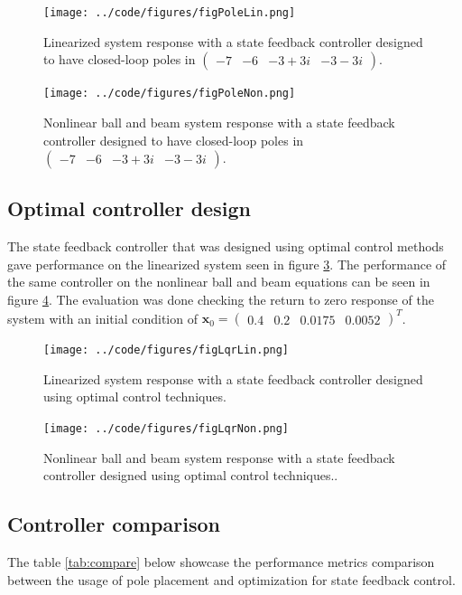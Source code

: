 \documentclass[a4paper, titlepage]{article}
\begin{document}
\begin{figure}[H]
\center
\texttt{[image: ../code/figures/figPoleLin.png]}
\caption{Linearized system response with a state feedback controller designed to have closed-loop poles in $\begin{pmatrix} -7 & -6 & -3+3i & -3-3i \end{pmatrix}$.}
\label{fig:poleLin}
\end{figure}

\begin{figure}[H]
\center
\texttt{[image: ../code/figures/figPoleNon.png]}
\caption{Nonlinear ball and beam system response with a state feedback controller designed to have closed-loop poles in $\begin{pmatrix} -7 & -6 & -3+3i & -3-3i \end{pmatrix}$.}
\label{fig:poleNon}
\end{figure}

\subsection{Optimal controller design}
The state feedback controller that was designed using optimal control methods gave performance on the linearized system seen in figure \ref{fig:lqrLin}.
The performance of the same controller on the nonlinear ball and beam equations can be seen in figure \ref{fig:lqrNon}.
The evaluation was done checking the return to zero response of the system with an initial condition of $\textbf{x}_0 = \begin{pmatrix} 0.4 & 0.2 & 0.0175 & 0.0052 \end{pmatrix}^T$.

\begin{figure}[H]
\center
\texttt{[image: ../code/figures/figLqrLin.png]}
\caption{Linearized system response with a state feedback controller designed using optimal control techniques.}
\label{fig:lqrLin}
\end{figure}

\begin{figure}[H]
\center
\texttt{[image: ../code/figures/figLqrNon.png]}
\caption{Nonlinear ball and beam system response with a state feedback controller designed using optimal control techniques..}
\label{fig:lqrNon}
\end{figure}

\subsection{Controller comparison}
The table \ref{tab:compare} below showcase the performance metrics comparison between the usage of pole placement and optimization for state feedback control.
\end{document}
